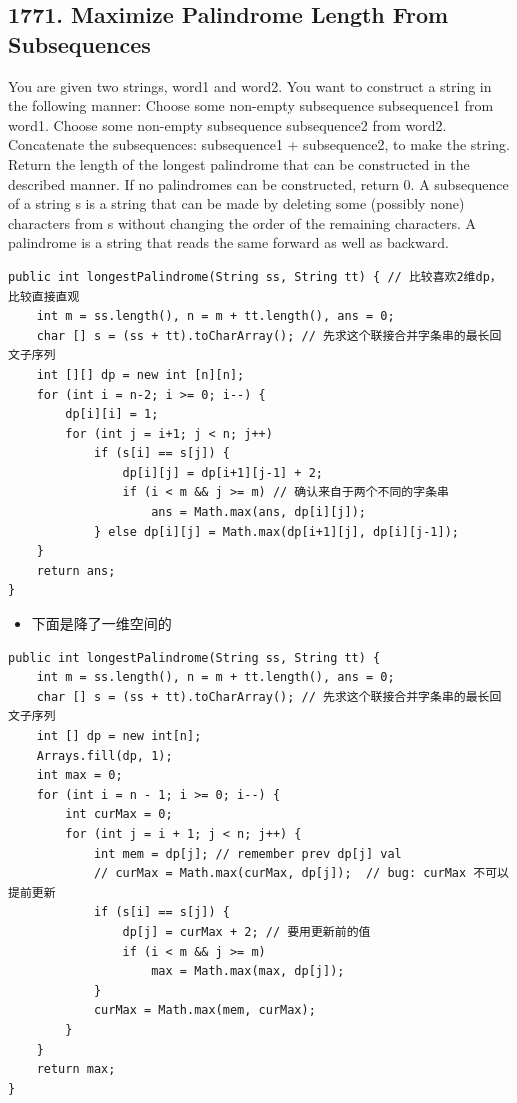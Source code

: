 \documentclass[9pt, b5paaper]{book}
\begin{document}
\subsection{1771. Maximize Palindrome Length From Subsequences}
\label{sec-1-4-41}
You are given two strings, word1 and word2. You want to construct a string in the following manner:
Choose some non-empty subsequence subsequence1 from word1.
Choose some non-empty subsequence subsequence2 from word2.
Concatenate the subsequences: subsequence1 + subsequence2, to make the string.
Return the length of the longest palindrome that can be constructed in the described manner. If no palindromes can be constructed, return 0.
A subsequence of a string s is a string that can be made by deleting some (possibly none) characters from s without changing the order of the remaining characters.
A palindrome is a string that reads the same forward as well as backward.
\begin{verbatim}
public int longestPalindrome(String ss, String tt) { // 比较喜欢2维dp，比较直接直观
    int m = ss.length(), n = m + tt.length(), ans = 0;
    char [] s = (ss + tt).toCharArray(); // 先求这个联接合并字条串的最长回文子序列
    int [][] dp = new int [n][n];
    for (int i = n-2; i >= 0; i--) {
        dp[i][i] = 1;
        for (int j = i+1; j < n; j++) 
            if (s[i] == s[j]) {
                dp[i][j] = dp[i+1][j-1] + 2;
                if (i < m && j >= m) // 确认来自于两个不同的字条串
                    ans = Math.max(ans, dp[i][j]);
            } else dp[i][j] = Math.max(dp[i+1][j], dp[i][j-1]);
    }
    return ans;
}
\end{verbatim}
\begin{itemize}
\item 下面是降了一维空间的
\end{itemize}
\begin{verbatim}
public int longestPalindrome(String ss, String tt) {
    int m = ss.length(), n = m + tt.length(), ans = 0;
    char [] s = (ss + tt).toCharArray(); // 先求这个联接合并字条串的最长回文子序列
    int [] dp = new int[n];
    Arrays.fill(dp, 1);
    int max = 0;
    for (int i = n - 1; i >= 0; i--) {
        int curMax = 0;
        for (int j = i + 1; j < n; j++) {
            int mem = dp[j]; // remember prev dp[j] val
            // curMax = Math.max(curMax, dp[j]);  // bug: curMax 不可以提前更新
            if (s[i] == s[j]) {
                dp[j] = curMax + 2; // 要用更新前的值
                if (i < m && j >= m)
                    max = Math.max(max, dp[j]);
            }
            curMax = Math.max(mem, curMax);
        }
    }
    return max;
}
\end{verbatim}
\end{document}
